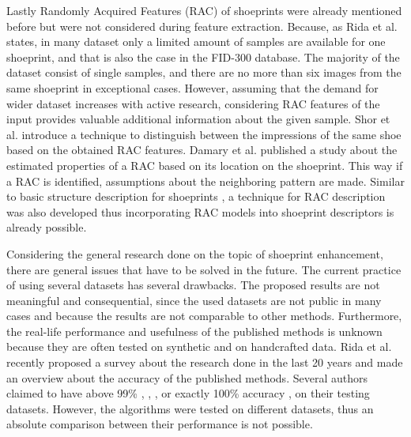 \documentclass[draft,final]{vutinfth} %
\begin{document}
\par
Lastly Randomly Acquired Features (RAC) of shoeprints were already mentioned before but were not considered during feature extraction.
Because, as Rida et al. \cite{rida2019forensic} states, in many dataset only a limited amount of samples are available for one shoeprint, and that is also the case in the FID-300 database.
The majority of the dataset consist of single samples, and there are no more than six images from the same shoeprint in exceptional cases. 
However, assuming that the demand for wider dataset increases with active research, considering RAC features of the input provides valuable additional information about the given sample.
Shor et al. \cite{shor2018inherent} introduce a technique to distinguish between the impressions of the same shoe based on the obtained RAC features.
Damary et al. \cite{damary2018dependence} published a study about the estimated properties of a RAC based on its location on the shoeprint.
This way if a RAC is identified, assumptions about the neighboring pattern are made.
Similar to basic structure description for shoeprints \cite{tang2010footwear}, a technique for RAC description was also developed \cite{speir2016quantifying} thus incorporating RAC models into shoeprint descriptors is already possible.
\par
Considering the general research done on the topic of shoeprint enhancement, there are general issues that have to be solved in the future.
The current practice of using several datasets has several drawbacks.
The proposed results are not meaningful and consequential, since the used datasets are not public in many cases and because the results are not comparable to other methods.
Furthermore, the real-life performance and usefulness of the published methods is unknown because they are often tested on synthetic and on handcrafted data.
Rida et al. \cite{rida2019forensic} recently proposed a survey about the research done in the last 20 years and made an overview about the accuracy of the published methods.
Several authors claimed to have above 99\% \cite{algarni2008novel}, \cite{alizadeh2017automatic}, \cite{almaadeed2015partial}, or exactly 100\% accuracy \cite{gueham2007automatic}, on their testing datasets.
However, the algorithms were tested on different datasets, thus an absolute comparison between their performance is not possible.


\backmatter
\end{document}
